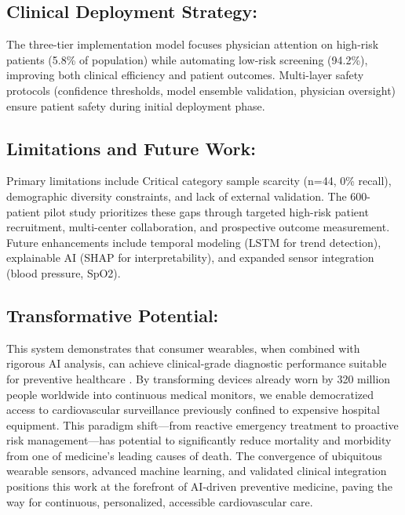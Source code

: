 \documentclass[3p,times,procedia]{elsarticle}
\begin{document}
\subsection{Clinical Deployment Strategy:}
\vspace{-2pt}
The three-tier implementation model focuses physician attention on high-risk patients (5.8\% of population) while automating low-risk screening (94.2\%), improving both clinical efficiency and patient outcomes. Multi-layer safety protocols (confidence thresholds, model ensemble validation, physician oversight) ensure patient safety during initial deployment phase.

\subsection{Limitations and Future Work:}
\vspace{-2pt}
Primary limitations include Critical category sample scarcity (n=44, 0\% recall), demographic diversity constraints, and lack of external validation. The 600-patient pilot study prioritizes these gaps through targeted high-risk patient recruitment, multi-center collaboration, and prospective outcome measurement. Future enhancements include temporal modeling (LSTM for trend detection), explainable AI (SHAP for interpretability), and expanded sensor integration (blood pressure, SpO2).

\subsection{Transformative Potential:}
\vspace{-2pt}
This system demonstrates that consumer wearables, when combined with rigorous AI analysis, can achieve clinical-grade diagnostic performance suitable for preventive healthcare \cite{dunn2018wearables,steinhubl2018effect}. By transforming devices already worn by 320 million people worldwide into continuous medical monitors, we enable democratized access to cardiovascular surveillance previously confined to expensive hospital equipment. This paradigm shift—from reactive emergency treatment to proactive risk management—has potential to significantly reduce mortality and morbidity from one of medicine's leading causes of death.
The convergence of ubiquitous wearable sensors, advanced machine learning, and validated clinical integration positions this work at the forefront of AI-driven preventive medicine, paving the way for continuous, personalized, accessible cardiovascular care.
\end{document}
